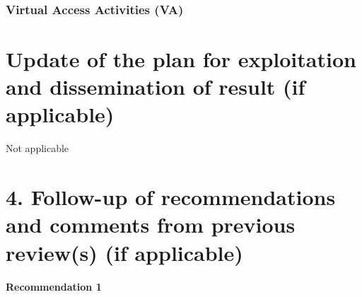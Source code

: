 \documentclass{deliverablereport}
\begin{document}


  \subsubsection{Virtual Access Activities (VA)}






  \section{Update of the plan for exploitation and dissemination of result (if
    applicable)}
 Not applicable



  \section{4. Follow-up of recommendations and comments from previous review(s) (if
    applicable)}
  
\paragraph{Recommendation 1}
\end{document}
